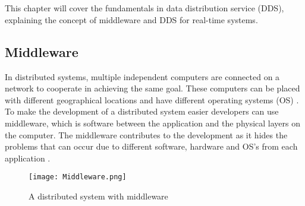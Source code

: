 \documentclass[Main]{subfiles}
\begin{document}
\chapter{}
This chapter will cover the fundamentals in data distribution service (DDS), explaining the concept of middleware and DDS for real-time systems.
\\
\section{Middleware}
In distributed systems, multiple independent computers are connected on a network to cooperate in achieving the same goal. 
These computers can be placed with different geographical locations and have different operating systems (OS) \cite[p. 2]{Tanenbaum}.
\\ 
To make the development of a distributed system easier developers can use middleware, which is software between the application and the physical layers on the computer. 
The middleware contributes to the development as it hides the problems that can occur due to different software, hardware and OS's from each application \cite[p. 3]{Tanenbaum}.

\begin{figure}[H]
\centering
\texttt{[image: Middleware.png]}
\caption{A distributed system with middleware \cite[p. 3]{Tanenbaum}}
\label{Fig:Middleware}
\end{figure}
\end{document}
